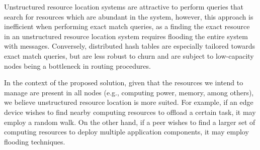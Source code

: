 Unstructured resource location systems are attractive to perform queries that search for resources which are abundant in the system, however, this approach is inefficient when performing exact match queries, as a finding the exact resource in an unstructured resource location system requires flooding the entire system with messages. Conversely, distributed hash tables are especially tailored towards exact match queries, but are less robust to churn and are subject to low-capacity nodes being a bottleneck in routing procedures. 

In the context of the proposed solution, given that the resources we intend to manage are present in all nodes (e.g., computing power, memory, among others), we believe unstructured resource location is more suited. For example, if an edge device wishes to find nearby computing resources to offload a certain task, it may employ a random walk. On the other hand, if a peer wishes to find a larger set of computing resources to deploy multiple application components, it may employ flooding techniques. 










